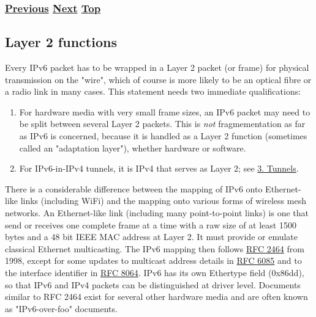 \documentclass[
]{article}
\begin{document}
\subsubsection{\texorpdfstring{\hyperref[packet-format]{Previous}
\hyperref[layer-2-functions]{Next}
\hyperref[ipv6-basic-technology]{Top}}{Previous Next Top}}\label{previous-next-top-8}

\pagebreak

\subsection{Layer 2 functions}\label{layer-2-functions}

Every IPv6 packet has to be wrapped in a Layer 2 packet (or frame) for
physical transmission on the "wire", which of course is more likely to
be an optical fibre or a radio link in many cases. This statement needs
two immediate qualifications:

\begin{enumerate}
\def\labelenumi{\arabic{enumi}.}
\item
  For hardware media with very small frame sizes, an IPv6 packet may
  need to be split between several Layer 2 packets. This is \emph{not}
  fragmementation as far as IPv6 is concerned, because it is handled as
  a Layer 2 function (sometimes called an "adaptation layer"), whether
  hardware or software.
\item
  For IPv6-in-IPv4 tunnels, it is IPv4 that serves as Layer 2; see
  \hyperref[tunnels]{3. Tunnels}.
\end{enumerate}

There is a considerable difference between the mapping of IPv6 onto
Ethernet-like links (including WiFi) and the mapping onto various forms
of wireless mesh networks. An Ethernet-like link (including many
point-to-point links) is one that send or receives one complete frame at
a time with a raw size of at least 1500 bytes and a 48 bit IEEE MAC
address at Layer 2. It must provide or emulate classical Ethernet
multicasting. The IPv6 mapping then follows
\href{https://www.rfc-editor.org/info/rfc2464}{RFC 2464} from 1998,
except for some updates to multicast address details in
\href{https://www.rfc-editor.org/info/rfc6085}{RFC 6085} and to the
interface identifier in
\href{https://www.rfc-editor.org/info/rfc8064}{RFC 8064}. IPv6 has its
own Ethertype field (0x86dd), so that IPv6 and IPv4 packets can be
distinguished at driver level. Documents similar to RFC 2464 exist for
several other hardware media and are often known as "IPv6-over-foo"
documents.
\end{document}
